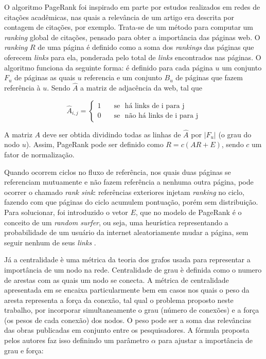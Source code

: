 \documentclass[12pt]{article}
\begin{document}
O algoritmo PageRank \cite{page1999pagerank} foi inspirado em parte por estudos realizados em redes de citações acadêmicas, nas quais a relevância de um artigo era descrita por contagem de citações, por exemplo. Trata-se de um método para computar um \textit{ranking}  global de citações, pensado para obter a importância das páginas web. O \textit{ranking} $R$ de uma página é definido como a soma dos \textit{rankings} das páginas que oferecem \textit{links} para ela, ponderada pelo total de \textit{links} encontrados nas páginas. O algoritmo funciona da seguinte forma: é definido para cada página $u$ um conjunto $F_u$ de páginas as quais $u$ referencia e um conjunto $B_u$ de páginas que fazem referência à $u$. Sendo $\hat{A}$ a matriz de adjacência da web, tal que 

\begin{equation} \label{eqn:adjacency-matrix}
   \hat{A}_{i,j} =
    \begin{cases}
      1       & \quad \text{se } \text{ há links de i para j}\\
      0       & \quad \text{se } \text{ não há links de i para j}
    \end{cases}
\end{equation}

A matriz $A$ deve ser obtida dividindo todas as linhas de $\hat{A}$ por $|F_u|$ (o grau do nodo $u$). Assim, PageRank pode ser definido como $R = c(AR + E)$, sendo $c$ um fator de normalização.

Quando ocorrem ciclos no fluxo de referência, nos quais duas páginas se referenciam mutuamente e não fazem referência a nenhuma outra página, pode ocorrer o chamado \textit{rank sink}: referências exteriores injetam \textit{ranking} no ciclo, fazendo com que páginas do ciclo acumulem pontuação, porém sem distribuição. Para solucionar, foi introduzido o vetor $E$, que no modelo de PageRank é o conceito de um \textit{random surfer}, ou seja, uma heurística representando a probabilidade de um usuário da internet aleatoriamente mudar a página, sem seguir nenhum de seus \textit{links} \cite{page1999pagerank}.

Já a centralidade è uma métrica da teoria dos grafos usada para representar a importância de um nodo na rede. Centralidade de grau è definida como o numero de arestas com as quais um nodo se conecta. A métrica de centralidade apresentada em \cite{opsahl2010node} se encaixa particularmente bem em casos nos quais o peso da aresta representa a força da conexão, tal qual o problema proposto neste trabalho, por incorporar simultaneamente o grau (número de conexões) e a força (os pesos de cada conexão) dos nodos. O peso pode ser a soma das relevâncias das obras publicadas em conjunto entre os pesquisadores. A fórmula proposta pelos autores faz isso definindo um parâmetro $\alpha$ para ajustar a importância de grau e força:
\end{document}
